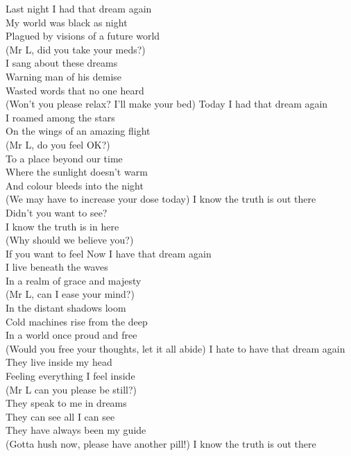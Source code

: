 Last night I had that dream again\\
My world was black as night\\
Plagued by visions of a future world\\
(Mr L, did you take your meds?)\\
I sang about these dreams\\
Warning man of his demise\\
Wasted words that no one heard\\
(Won't you please relax? I'll make your bed)
\hop
Today I had that dream again\\
I roamed among the stars\\
On the wings of an amazing flight\\
(Mr L, do you feel OK?)\\
To a place beyond our time\\
Where the sunlight doesn't warm\\
And colour bleeds into the night\\
(We may have to increase your dose today)
\hops
{} I know the truth is out there\\
 Didn't you want to see?\\
 I know the truth is in here\\
 (Why should we believe you?)\\
 If you want to feel
\hops
Now I have that dream again\\
I live beneath the waves\\
In a realm of grace and majesty\\
(Mr L, can I ease your mind?)\\
In the distant shadows loom\\
Cold machines rise from the deep\\
In a world once proud and free\\
(Would you free your thoughts, let it all abide)
\hop
I hate to have that dream again\\
They live inside my head\\
Feeling everything I feel inside\\
(Mr L can you please be still?)\\
They speak to me in dreams\\
They can see all I can see\\
They have always been my guide\\
(Gotta hush now, please have another pill!)
\hops
{} I know the truth is out there\\
